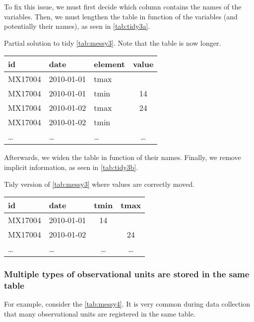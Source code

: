 To fix this issue, we must first decide which column contains the names of the variables.
Then, we must lengthen the table in function of the variables (and potentially their
names), as seen in \cref{tab:tidy3a}.

\begin{tablebox}[label=tab:tidy3a]{Partial solution to tidy \cref{tab:messy3}. Note that
  the table is now longer.}
  \centering
  \begin{tabular}{lllc}
    \toprule
    \textbf{id} & \textbf{date} & \textbf{element} & \textbf{value} \\
    \midrule
    MX17004 & 2010-01-01 & tmax &    \\
    MX17004 & 2010-01-01 & tmin & 14 \\
    MX17004 & 2010-01-02 & tmax & 24 \\
    MX17004 & 2010-01-02 & tmin &    \\
    \dots & \dots & \dots & \dots \\
    \bottomrule
  \end{tabular}
\end{tablebox}

\clearpage
Afterwards, we widen the table in function of their names.  Finally, we remove
implicit information, as seen in \cref{tab:tidy3b}.

\begin{tablebox}[label=tab:tidy3b]{Tidy version of \cref{tab:messy3} where values are correctly moved.}
  \centering
  \begin{tabular}{llcc}
    \toprule
    \textbf{id} & \textbf{date} & \textbf{tmin} & \textbf{tmax} \\
    \midrule
    MX17004 & 2010-01-01 & 14 &    \\
    MX17004 & 2010-01-02 &    & 24 \\
    \dots & \dots & \dots & \dots \\
    \bottomrule
  \end{tabular}
\end{tablebox}

\subsubsection{Multiple types of observational units are stored in the same table}  For
example, consider the \cref{tab:messy4}.  It is very common during data collection that
many observational units are registered in the same table.

